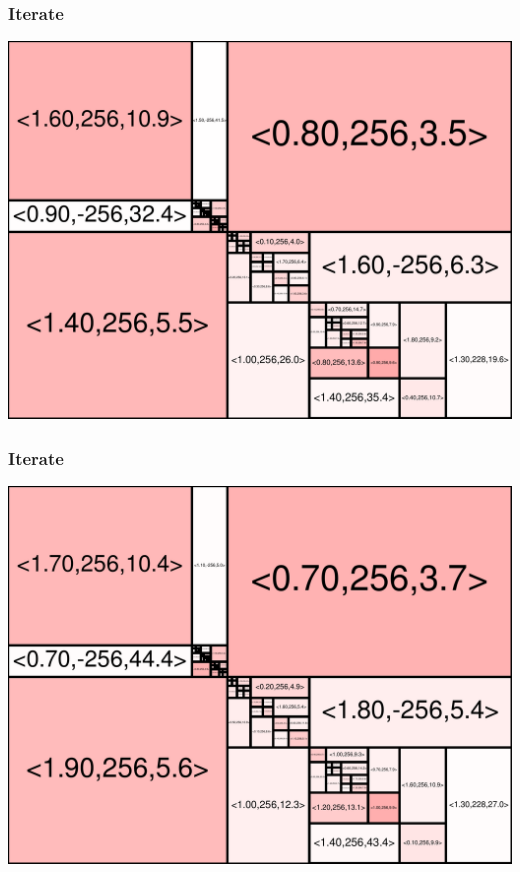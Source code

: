 \begin{frame}
\frametitle{Iterate}\begin{centering}\includegraphics[width=8.5 cm]{remy-graph/graph/test87.pdf}

\end{centering}\end{frame}


\begin{frame}
\frametitle{Iterate}\begin{centering}\includegraphics[width=8.5 cm]{remy-graph/graph/test88.pdf}

\end{centering}\end{frame}
